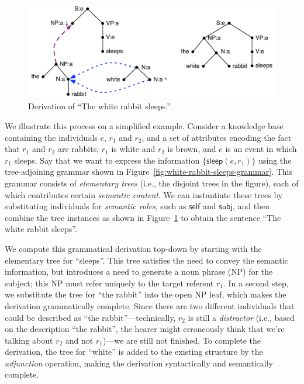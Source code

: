 \begin{figure}
  \centering
  \includegraphics[width=\columnwidth]{pic-derivation}
  \caption{Derivation of ``The white rabbit sleeps.''}
  \label{fig:white-rabbit-sleeps-deriv}
\end{figure}


We illustrate this process on a simplified example.  Consider a
knowledge base containing the individuals $e$, $r_1$ and $r_2$, and a
set of attributes encoding the fact that $r_1$ and $r_2$ are rabbits,
$r_1$ is white and $r_2$ is brown, and $e$ is an event in which $r_1$
sleeps.  Say that we want to express the information
$\{\mathsf{sleep}(e,r_1)\}$ using the tree-adjoining grammar shown in
Figure~\ref{fig:white-rabbit-sleeps-grammar}. This grammar consists of
\emph{elementary trees} (i.e., the disjoint trees in the figure), each
of which contributes certain \emph{semantic content}. We can
instantiate these trees by substituting individuals for \emph{semantic
  roles}, such as $\mathsf{self}$ and $\mathsf{subj}$, and then
combine the tree instances as shown in
Figure~\ref{fig:white-rabbit-sleeps-deriv} to obtain the sentence
``The white rabbit sleeps''.

We compute this grammatical derivation top-down by starting with the
elementary tree for ``sleeps''. This tree satisfies the need to convey
the semantic information, but introduces a need to generate a noun
phrase (NP) for the subject; this NP must refer uniquely to the target
referent $r_1$. In a second step, we substitute the tree for ``the
rabbit'' into the open NP leaf, which makes the derivation
grammatically complete. Since there are two different individuals that
could be described as ``the rabbit''---technically, $r_2$ is still a
\emph{distractor} (i.e., based on the description ``the rabbit'', the
hearer might erroneously think that we're talking about $r_2$ and not
$r_1$)---we are still not finished. To complete the derivation, the
tree for ``white'' is added to the existing structure by the
\emph{adjunction} operation, making the derivation syntactically and
semantically complete.


